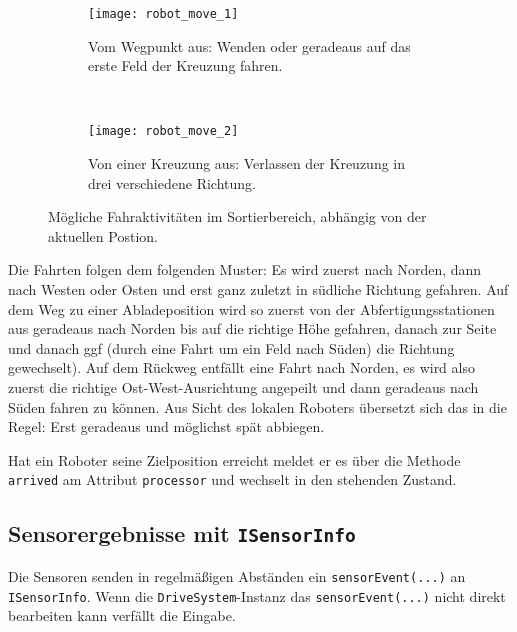 \begin{figure}[t]
	\centering
	\begin{subfigure}[b]{0.45\textwidth}
		\centering
		\texttt{[image: robot\_move\_1]}
		\caption{Vom Wegpunkt aus: Wenden oder geradeaus auf das erste Feld der Kreuzung fahren.}
		\label{fig:move_1}
	\end{subfigure}
	~~~~~
	\begin{subfigure}[b]{0.45\textwidth}
		\centering
		\texttt{[image: robot\_move\_2]}
		\caption{Von einer Kreuzung aus: Verlassen der Kreuzung in drei verschiedene Richtung.}
		\label{fig:move_2}
	\end{subfigure}
	\caption{Mögliche Fahraktivitäten im Sortierbereich, abhängig von der aktuellen Postion.}
	\label{fig:move}
\end{figure}

Die Fahrten folgen dem folgenden Muster: Es wird zuerst nach Norden, dann nach Westen oder Osten und erst ganz zuletzt in südliche Richtung gefahren. Auf dem Weg zu einer Abladeposition wird so zuerst von der Abfertigungsstationen aus geradeaus nach Norden bis auf die richtige Höhe gefahren, danach zur Seite und danach ggf (durch eine Fahrt um ein Feld nach Süden) die Richtung gewechselt). Auf dem Rückweg entfällt eine Fahrt nach Norden, es wird also zuerst die richtige Ost-West-Ausrichtung angepeilt und dann geradeaus nach Süden fahren zu können.
Aus Sicht des lokalen Roboters übersetzt sich das in die Regel: Erst geradeaus und möglichst spät abbiegen.

Hat ein Roboter seine Zielposition erreicht meldet er es über die Methode \texttt{arrived} am Attribut \texttt{processor} und wechselt in den stehenden Zustand.






\subsection{Sensorergebnisse mit \texttt{ISensorInfo}}
\label{subsec:sensor}


Die Sensoren senden in regelmäßigen Abständen ein \texttt{sensorEvent(...)} an \texttt{ISensorInfo}. Wenn die \texttt{DriveSystem}-Instanz das \texttt{sensorEvent(...)} nicht direkt bearbeiten kann verfällt die Eingabe.

